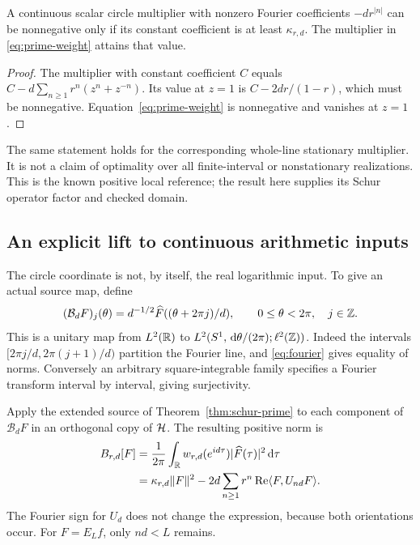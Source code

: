 \begin{corollary}
\label{cor:contact}
A continuous scalar circle multiplier with nonzero Fourier coefficients
$-dr^{|n|}$ can be nonnegative only if its constant coefficient is at
least $\kappa_{r,d}$. The multiplier in \eqref{eq:prime-weight} attains
that value.
\end{corollary}
\begin{proof}
The multiplier with constant coefficient $C$ equals
$C-d\sum_{n\geq1}r^n(z^n+z^{-n})$. Its value at $z=1$ is
$C-2dr/(1-r)$, which must be nonnegative. Equation~\eqref{eq:prime-weight}
is nonnegative and vanishes at $z=1$.
\end{proof}
The same statement holds for the corresponding whole-line stationary
multiplier. It is not a claim of optimality over all finite-interval
or nonstationary realizations. This is the known positive local reference;
the result here supplies its Schur operator factor and checked domain.

\subsection{An explicit lift to continuous arithmetic inputs}
The circle coordinate is not, by itself, the real logarithmic input.
To give an actual source map, define
\begin{equation}\label{eq:bloch}
 (\mathcal B_dF)_j(\theta)=d^{-1/2}
 \widehat F((\theta+2\pi j)/d),\qquad
 0\leq\theta<2\pi,\quad j\in\mathbb Z.
\end{equation}
This is a unitary map from $L^2(\mathbb R)$ to
$L^2(S^1,\,\mathrm d\theta/(2\pi);\ell^2(\mathbb Z))$. Indeed the intervals
$[2\pi j/d,2\pi(j+1)/d)$ partition the Fourier line, and
\eqref{eq:fourier} gives equality of norms. Conversely an arbitrary
square-integrable family specifies a Fourier transform interval by
interval, giving surjectivity.

Apply the extended source of Theorem~\ref{thm:schur-prime} to each
component of $\mathcal B_dF$ in an orthogonal copy of $\mathcal H$. The
resulting positive norm is
\begin{align}
 B_{r,d}[F]
 &=\frac1{2\pi}\int_\mathbb R w_{r,d}(e^{id\tau})
                   |\widehat F(\tau)|^2\,\mathrm d\tau\notag\\
 &=\kappa_{r,d}\lVert F\rVert^2
   -2d\sum_{n\geq1}r^n\operatorname{Re}\langle F,U_{nd}F\rangle.
 \label{eq:lifted-norm}
\end{align}
The Fourier sign for $U_d$ does not change the expression, because
both orientations occur. For $F=E_Lf$, only $nd<L$ remains.

